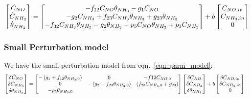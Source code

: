 \begin{equation}\label{eqn::parm_model}
     \begin{bmatrix} \dot C_{NO} \\
        \dot C_{NH_3}\\
        \dot \theta_{NH_3}\\
         \end{bmatrix} =
    \begin{bmatrix} 
        -f_{12} C_{NO} \theta_{NH_3}
        -g_1 C_{NO}
        \\
        -g_2 C_{NH_3}
        + f_{23} C_{NH_3} \theta_{NH_3}
        + g_{23} \theta_{NH_3}
        \\
        -f_{32} C_{NH_3} \theta_{NH_3}
        -g_2 \theta_{NH_3}
        -p_5 C_{NO} \theta_{NH_3}
        + p_3 C_{NH_3}
     \end{bmatrix}
    + b \begin{bmatrix} C_{NO, in} \\ C_{NH_3, in} \\ 0 \end{bmatrix}
\end{equation}

\subsubsection{Small Perturbation model}
We have the small-perturbation model from eqn.~\ref{eqn::parm_model}:
\begin{align*}
     \begin{bmatrix} \delta \dot C_{NO} \\
        \delta \dot C_{NH_3}\\
        \delta \dot \theta_{NH_3}\\
         \end{bmatrix} &=
    \begin{bmatrix} 
        -\left( g_1 + f_{12} \theta_{NH_3,0} \right) &
        0                                  &
        -f{12} C_{NO, 0}
        \\
        0 &
        -\left( g_2 - f_{23} \theta_{NH_3, 0} \right) &
        \left( f_{23} C_{NH_3, 0} + g_{23} \right)
        \\
        -p_5 \theta_{NH_3, 0}   &
                                &
     \end{bmatrix}
    \begin{bmatrix} \delta C_{NO} \\
        \delta C_{NH_3}\\
        \delta \theta_{NH_3}\\
         \end{bmatrix}
    + b \begin{bmatrix} \delta C_{NO, in} \\ \delta C_{NH_3, in} \\ 0 \end{bmatrix}
\end{align*}




%
